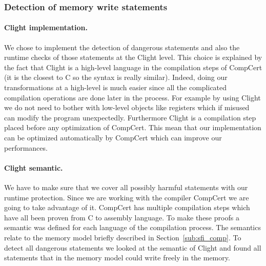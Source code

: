 \documentclass[11pt]{sdm}
\begin{document}
\subsubsection{Detection of memory write statements}
\label{ssub:Detection of memory write statements}

\paragraph{Clight implementation.}
\label{par:Clight implementation}

We chose to implement the detection of dangerous statements and also the runtime checks of those statements at the Clight level.
This choice is explained by the fact that Clight is a high-level language in the compilation steps of CompCert (it is the closest to C so the syntax is really similar).
Indeed, doing our transformations at a high-level is much easier since all the complicated compilation operations are done later in the process.
For example by using Clight we do not need to bother with low-level objects like registers which if misused can modify the program unexpectedly.
Furthermore Clight is a compilation step placed before any optimization of CompCert.
This mean that our implementation can be optimized automatically by CompCert which can improve our performances.

\paragraph{Clight semantic.}
\label{par:Clight semantic}

We have to make sure that we cover all possibly harmful statements with our runtime protection.
Since we are working with the compiler CompCert we are going to take advantage of it.
CompCert has multiple compilation steps which have all been proven from C to assembly language.
To make these proofs a semantic was defined for each language of the compilation process. The semantics relate to the memory model briefly described in Section~\ref{sub:sfi_comp}.
To detect all dangerous statements we looked at the semantic of Clight and found all statements that in the memory model could write freely in the memory.\\
\end{document}
